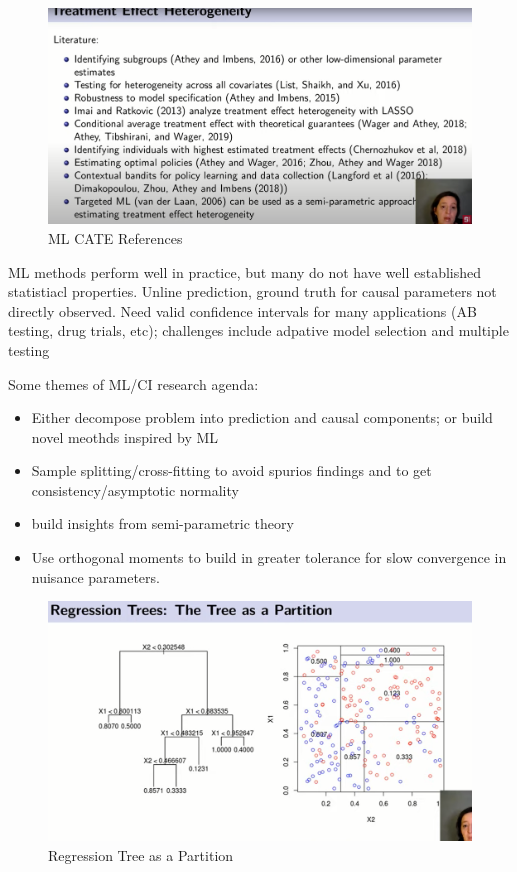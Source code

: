 \documentclass{article}
\begin{document}
\begin{figure}[H]
    \centering
    \includegraphics[scale = 0.3]{ref_cate.png}
    \caption{ML CATE References}
    \label{fig:cate_ref}
\end{figure}


ML methods perform well in practice, but many do not have well established statistiacl properties. Unline prediction, ground truth for causal parameters not directly observed. Need valid confidence intervals for many applications (AB testing, drug trials, etc); challenges include adpative model selection and multiple testing

Some themes of ML/CI research agenda:

\begin{itemize}
    \item Either decompose problem into prediction and causal components; or build novel meothds inspired by ML
    \item Sample splitting/cross-fitting to avoid spurios findings and to get consistency/asymptotic normality
    \item build insights from semi-parametric theory
    \item Use orthogonal moments to build in greater tolerance for slow convergence in nuisance parameters.
\end{itemize}




\begin{figure}[H]
    \centering
    \includegraphics[scale = 0.3]{reg_tree_partition.png}
    \caption{Regression Tree as a Partition}
    \label{fig:reg_partition}
\end{figure}
\end{document}

